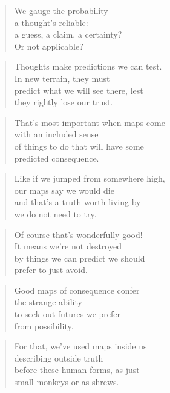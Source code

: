 \documentclass[14pt,a4paper]{article}
\begin{document}
\begin{verse}
We gauge the probability\\
a thought’s reliable:\\
a guess, a claim, a certainty?\\
Or not applicable?
\end{verse}

\begin{verse}
Thoughts make predictions we can test.\\
In new terrain, they must\\
predict what we will see there, lest\\
they rightly lose our trust.
\end{verse}

\begin{verse}
That’s most important when maps come\\
with an included sense\\
of things to do that will have some\\
predicted consequence.
\end{verse}

\begin{verse}
Like if we jumped from somewhere high,\\
our maps say we would die\\
and that’s a truth worth living by\\
we do not need to try.
\end{verse}

\begin{verse}
Of course that’s wonderfully good!\\
It means we’re not destroyed\\
by things we can predict we should\\
prefer to just avoid.
\end{verse}

\begin{verse}
Good maps of consequence confer\\
the strange ability\\
to seek out futures we prefer\\
from possibility.
\end{verse}

\begin{verse}
For that, we’ve used maps inside us\\
describing outside truth\\
before these human forms, as just\\
small monkeys or as shrews.
\end{verse}
\end{document}
